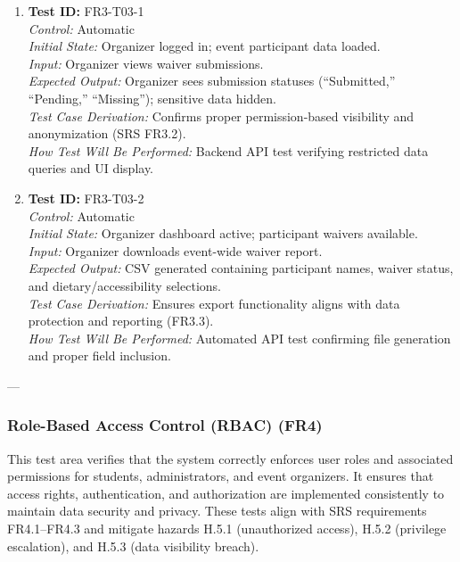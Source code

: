 \documentclass[12pt, titlepage]{article}
\begin{document}
\begin{enumerate}\setlength{\itemsep}{1em}
    \item \textbf{Test ID:} FR3-T03-1\\[0.5em]
    \textit{Control:} Automatic\\[0.3em]
    \textit{Initial State:} Organizer logged in; event participant data loaded.\\[0.3em]
    \textit{Input:} Organizer views waiver submissions.\\[0.3em]
    \textit{Expected Output:} Organizer sees submission statuses (“Submitted,” “Pending,” “Missing”); sensitive data hidden.\\[0.3em]
    \textit{Test Case Derivation:} Confirms proper permission-based visibility and anonymization (SRS FR3.2).\\[0.3em]
    \textit{How Test Will Be Performed:} Backend API test verifying restricted data queries and UI display.

    \item \textbf{Test ID:} FR3-T03-2\\[0.5em]
    \textit{Control:} Automatic\\[0.3em]
    \textit{Initial State:} Organizer dashboard active; participant waivers available.\\[0.3em]
    \textit{Input:} Organizer downloads event-wide waiver report.\\[0.3em]
    \textit{Expected Output:} CSV generated containing participant names, waiver status, and dietary/accessibility selections.\\[0.3em]
    \textit{Test Case Derivation:} Ensures export functionality aligns with data protection and reporting (FR3.3).\\[0.3em]
    \textit{How Test Will Be Performed:} Automated API test confirming file generation and proper field inclusion.
\end{enumerate}

---

\subsubsection{Role-Based Access Control (RBAC) (FR4)}

This test area verifies that the system correctly enforces user roles and associated permissions for students, administrators, and event organizers. It ensures that access rights, authentication, and authorization are implemented consistently to maintain data security and privacy. These tests align with SRS requirements FR4.1–FR4.3 and mitigate hazards H.5.1 (unauthorized access), H.5.2 (privilege escalation), and H.5.3 (data visibility breach).
\end{document}
